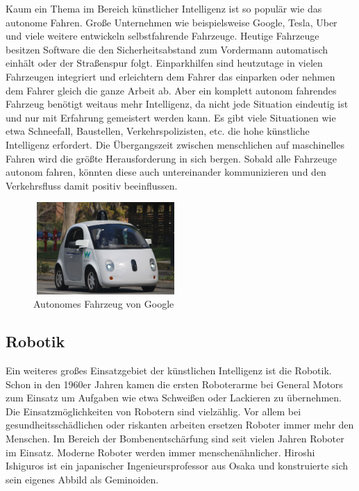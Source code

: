 \documentclass[oneside]{ausarbeitung}
\begin{document}
Kaum ein Thema im Bereich künstlicher Intelligenz ist so populär wie das autonome Fahren. Große Unternehmen wie beispielsweise Google, Tesla, Uber und viele weitere entwickeln selbstfahrende Fahrzeuge. Heutige Fahrzeuge besitzen Software die den Sicherheitsabstand zum Vordermann automatisch einhält oder der Straßenspur folgt. Einparkhilfen sind heutzutage in vielen Fahrzeugen integriert und erleichtern dem Fahrer das einparken oder nehmen dem Fahrer gleich die ganze Arbeit ab. Aber ein komplett autonom fahrendes Fahrzeug benötigt weitaus mehr Intelligenz, da nicht jede Situation eindeutig ist und nur mit Erfahrung gemeistert werden kann. Es gibt viele Situationen wie etwa Schneefall, Baustellen, Verkehrspolizisten, etc. die hohe künstliche Intelligenz erfordert. Die Übergangszeit zwischen menschlichen auf maschinelles Fahren wird die größte Herausforderung in sich bergen. Sobald alle Fahrzeuge autonom fahren, könnten diese auch untereinander kommunizieren und den Verkehrsfluss damit positiv beeinflussen.

\begin{figure}[ht]
	\centering
	\includegraphics[width=5.5cm,height=3.5cm]{images/Waymo_self-driving_car_front_view.jpg}
	\caption[Autonomes Fahrzeug von Google]{Autonomes Fahrzeug von Google}
\end{figure}

\subsection{Robotik}

Ein weiteres großes Einsatzgebiet der künstlichen Intelligenz ist die Robotik. Schon in den 1960er Jahren kamen die ersten Roboterarme bei General Motors zum Einsatz um Aufgaben wie etwa Schweißen oder Lackieren zu übernehmen. Die Einsatzmöglichkeiten von Robotern sind vielzählig. Vor allem bei gesundheitsschädlichen oder riskanten arbeiten ersetzen Roboter immer mehr den Menschen. Im Bereich der Bombenentschärfung sind seit vielen Jahren Roboter im Einsatz.
Moderne Roboter werden immer menschenähnlicher. Hiroshi Ishiguros ist ein japanischer Ingenieursprofessor aus Osaka und konstruierte sich sein eigenes Abbild als Geminoiden.
\end{document}

